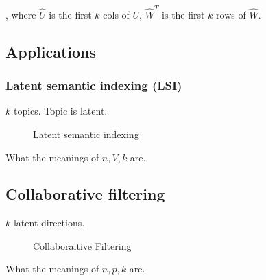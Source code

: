 \documentclass[a4paper]{report}
\begin{document}
, where $\hat U$ is the first $k$ cols of $U$, $\hat W^T$ is the first $k$ rows of $\hat W$. 

\subsection{Applications}
\subsubsection{Latent semantic indexing (LSI)}
$k$ topics. Topic is latent.

\begin{figure}[!htp]
\centering
{}
\caption{Latent semantic indexing}
\label{fig:lsi}
\end{figure}

What the meanings of $n, V, k$ are.
\subsection{Collaborative filtering}
$k$ latent directions. 

\begin{figure}[!htp]
\centering
{}
\caption{Collaboraitive Filtering}
\label{fig:collaborativeFiltering}
\end{figure}

What the meanings of $n, p, k$ are. 
\end{document}
